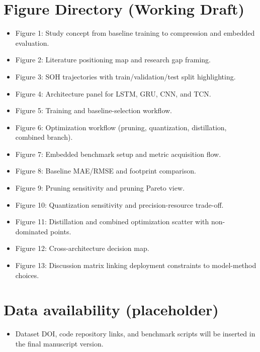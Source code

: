 ﻿\documentclass[review]{elsarticle}
\begin{document}
\section*{Figure Directory (Working Draft)}
\begin{itemize}[leftmargin=*]
\item Figure 1: Study concept from baseline training to compression and embedded evaluation.
\item Figure 2: Literature positioning map and research gap framing.
\item Figure 3: SOH trajectories with train/validation/test split highlighting.
\item Figure 4: Architecture panel for LSTM, GRU, CNN, and TCN.
\item Figure 5: Training and baseline-selection workflow.
\item Figure 6: Optimization workflow (pruning, quantization, distillation, combined branch).
\item Figure 7: Embedded benchmark setup and metric acquisition flow.
\item Figure 8: Baseline MAE/RMSE and footprint comparison.
\item Figure 9: Pruning sensitivity and pruning Pareto view.
\item Figure 10: Quantization sensitivity and precision-resource trade-off.
\item Figure 11: Distillation and combined optimization scatter with non-dominated points.
\item Figure 12: Cross-architecture decision map.
\item Figure 13: Discussion matrix linking deployment constraints to model-method choices.
\end{itemize}

\section*{Data availability (placeholder)}
\begin{itemize}[leftmargin=*]
\item Dataset DOI, code repository links, and benchmark scripts will be inserted in the final manuscript version.
\end{itemize}



\end{document}
